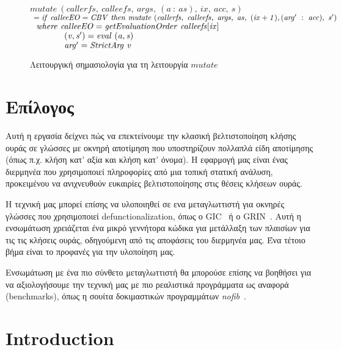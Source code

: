 \documentclass[diploma]{softlab-thesis}
\begin{document}
\begin{figure}[h]
  $\mathit{mutate~(callerfs,~calleefs,~args,~(a~:~as),~ix,~acc,~s)}$ \\ 
  $\mathit{\hfill\ =if~calleeEO=CBV~then~mutate~(callerfs,~calleefs,~args,~as,~(ix+1),(arg'~:~acc), ~s')}$ \\
  $\mathit{\hfill\ \hfill\ where~calleeEO=getEvaluationOrder~calleefs[ix]}$ \\  
  $\mathit{\hfill\ \hfill\ \hfill\ \hfill\ \hfill\ \hfill\ \hfill\ \hfill\ \hfill\ \hfill\ \hfill\ \hfill\ 
            (v, s') = eval~(a, s)}$ \\
  $\mathit{\hfill\ \hfill\ \hfill\ \hfill\ \hfill\ \hfill\ \hfill\ \hfill\ \hfill\ \hfill\ \hfill\ \hfill\ 
            arg'=StrictArg~v}$ \\
\caption{Λειτουργική σημασιολογία για τη λειτουργία $\mathit{mutate}$\label{fig:mutate-el}}
\end{figure}

%
\chapter{Επίλογος}

Αυτή η εργασία δείχνει πώς να επεκτείνουμε την κλασική βελτιστοποίηση κλήσης ουράς σε 
γλώσσες με οκνηρή αποτίμηση που υποστηρίζουν πολλαπλά είδη αποτίμησης (όπως π.χ.
κλήση κατ' αξία και κλήση κατ' όνομα). Η εφαρμογή μας είναι ένας
διερμηνέα που χρησιμοποιεί πληροφορίες από μια τοπική στατική ανάλυση, 
προκειμένου να ανιχνευθούν ευκαιρίες βελτιστοποίησης στις θέσεις κλήσεων ουράς.

Η τεχνική μας μπορεί επίσης να υλοποιηθεί σε ενα μεταγλωττιστή για οκνηρές 
γλώσσες που χρησιμοποιεί defunctionalization, όπως ο GIC~\cite{Fourtounis14} ή ο
GRIN~\cite{Boquist96,Podlovics19}.  Αυτή η ενσωμάτωση χρειάζεται ένα μικρό
γεννήτορα κώδικα για μετάλλαξη των πλαισίων για τις τις κλήσεις ουράς,
οδηγούμενη από τις αποφάσεις του διερμηνέα μας. Ένα τέτοιο βήμα είναι 
το προφανές για την υλοποίηση μας. 

Ενσωμάτωση με ένα πιο σύνθετο μεταγλωττιστή θα μπορούσε επίσης να βοηθήσει για να 
αξιολογήσουμε την τεχνική μας με πιο ρεαλιστικά προγράμματα ως αναφορά (benchmarks),
όπως η σουίτα δοκιμαστικών προγραμμάτων \emph{nofib}~\cite{nofib}.



\englishtext

\chapter{Introduction}
\label{ch:introduction}
\end{document}
